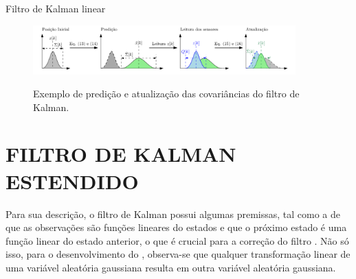 \documentclass[acronym, symbols, table]{fei}
\begin{document}

				\begin{algorithm}
					\caption{Filtro de Kalman linear}\label{alg:kf_algoritmo}
				\end{algorithm}
			
				\begin{figure}[!htb]
					\centering
					\caption{Exemplo de predição e atualização das covariâncias do filtro de Kalman.}
					\includegraphics[width=0.9\textwidth]{exemplo_filtro_de_kalman.png}
					\label{fig:exemplo_filtro_de_kalman_covariancias}
				\end{figure}
		
		\section{FILTRO DE KALMAN ESTENDIDO}
			
			Para sua descrição, o filtro de Kalman possui algumas premissas, tal como a de que as observações são funções lineares do estados e que o próximo estado é uma função linear do estado anterior, o que é crucial para a correção do filtro \cite{thrun2002probabilistic}. Não só isso, para o desenvolvimento do , observa-se que qualquer transformação linear de uma variável aleatória gaussiana resulta em outra variável aleatória gaussiana. 
			
\end{document}
